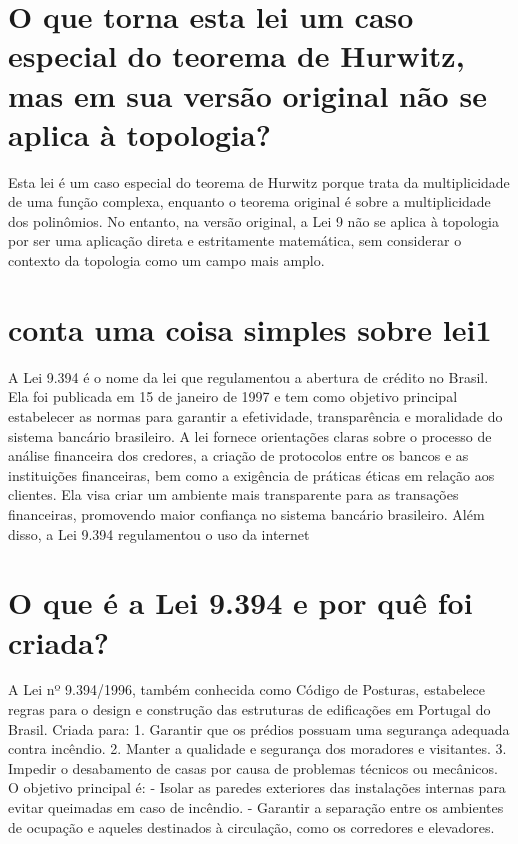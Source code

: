 \documentclass[11pt,a4paper]{article}
\begin{document}
\section{O que torna esta lei um caso especial do teorema de Hurwitz, mas em sua versão original não se aplica à topologia?}
Esta lei é um caso especial do teorema de Hurwitz porque trata da multiplicidade de uma função complexa, enquanto o teorema original é sobre a multiplicidade dos polinômios. No entanto, na versão original, a Lei 9 não se aplica à topologia por ser uma aplicação direta e estritamente matemática, sem considerar o contexto da topologia como um campo mais amplo.

\section{conta uma coisa simples sobre lei1}
A Lei 9.394 é o nome da lei que regulamentou a abertura de crédito no Brasil. Ela foi publicada em 15 de janeiro de 1997 e tem como objetivo principal estabelecer as normas para garantir a efetividade, transparência e moralidade do sistema bancário brasileiro. A lei fornece orientações claras sobre o processo de análise financeira dos credores, a criação de protocolos entre os bancos e as instituições financeiras, bem como a exigência de práticas éticas em relação aos clientes. Ela visa criar um ambiente mais transparente para as transações financeiras, promovendo maior confiança no sistema bancário brasileiro. Além disso, a Lei 9.394 regulamentou o uso da internet

\section{O que é a Lei 9.394 e por quê foi criada?}
A Lei nº 9.394/1996, também conhecida como Código de Posturas, estabelece regras para o design e construção das estruturas de edificações em Portugal do Brasil. Criada para: 1. Garantir que os prédios possuam uma segurança adequada contra incêndio. 2. Manter a qualidade e segurança dos moradores e visitantes. 3. Impedir o desabamento de casas por causa de problemas técnicos ou mecânicos. O objetivo principal é: - Isolar as paredes exteriores das instalações internas para evitar queimadas em caso de incêndio. - Garantir a separação entre os ambientes de ocupação e aqueles destinados à circulação, como os corredores e elevadores.
\end{document}
